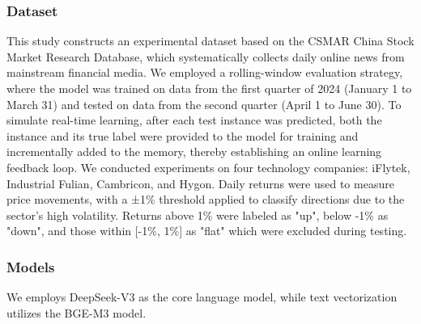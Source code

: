 \documentclass[sigconf, nonacm]{acmart} %
\begin{document}
\subsubsection{Dataset}
This study constructs an experimental dataset based on the CSMAR China Stock Market Research Database, which systematically collects daily online news from mainstream financial media.
We employed a rolling-window evaluation strategy, where the model was trained on data from the first quarter of 2024 (January 1 to March 31) and tested on data from the second quarter (April 1 to June 30). To simulate real-time learning, after each test instance was predicted, both the instance and its true label were provided to the model for training and incrementally added to the memory, thereby establishing an online learning feedback loop.
We conducted experiments on four technology companies: iFlytek, Industrial Fulian, Cambricon, and Hygon. Daily returns were used to measure price movements, with a ±1\% threshold applied to classify directions due to the sector's high volatility. Returns above 1\% were labeled as "up", below -1\% as "down", and those within [-1\%, 1\%] as "flat" which were excluded during testing.

\subsubsection{Models}
We employs DeepSeek-V3\cite{liu2024deepseek} as the core language model, while text vectorization utilizes the BGE-M3\cite{chen2024bge} model.
\end{document}
